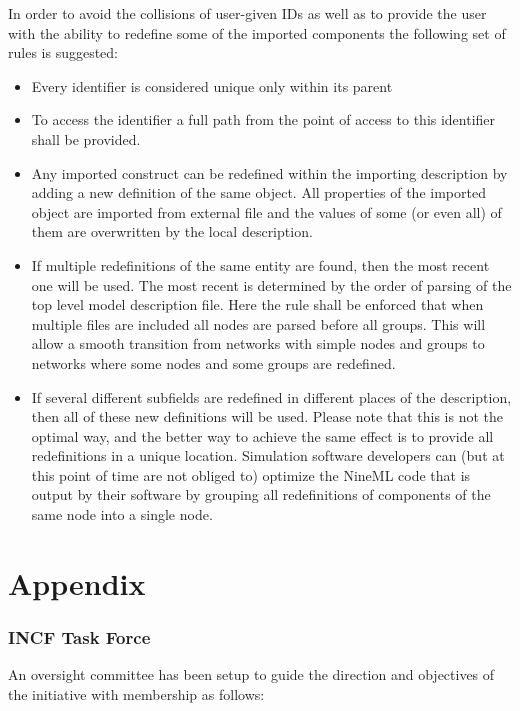 \documentclass{article}
\begin{document}
In order to avoid the collisions of user-given IDs as well as to
provide the user with the ability to redefine some of the imported
components the following set of rules is suggested:
\begin{itemize}
\item{Every identifier is considered unique only within its parent}
\item{To access the identifier a full path from the point of access
to this identifier shall be provided.}
\item{Any imported construct can be redefined within the importing
description by adding a new definition of the same object. All properties
of the imported object are imported from external file and the values of
some (or even all) of them are overwritten by the local description.}
\item{If multiple redefinitions of the same entity are found, then the most
recent one will be used. The most recent is determined by the order of
parsing of the top level model description file. Here the rule shall be
enforced that when multiple files are included all nodes are parsed before
all groups. This will allow a smooth transition from networks with simple
nodes and groups to networks where some nodes and some groups are redefined.}
\item{If several different subfields are redefined in different places of the
description, then all of these new definitions will be used. Please note that
this is not the optimal way, and the better way to achieve the same effect is
to provide all redefinitions in a unique location. Simulation software
developers can (but at this point of time are not obliged to) optimize the
NineML code that is output by their software by grouping all redefinitions
of components of the same node into a single node.}
\end{itemize}

\newpage
\appendix

\part*{Appendix}

\section{INCF Task Force}

An oversight committee has been setup to guide the direction and
objectives of the initiative with membership as follows:
\end{document}

